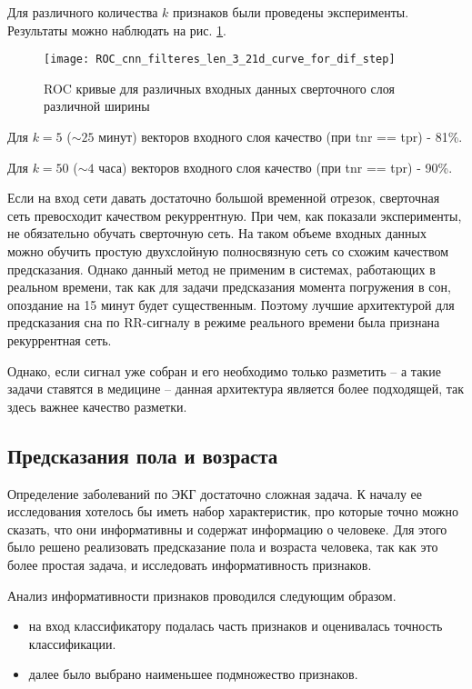 Для различного количества $k$ признаков были проведены эксперименты. Результаты можно наблюдать на рис. \ref{ris:roc_cnn}.

\begin{figure}[h!]
	\begin{center}
		\texttt{[image: ROC\_cnn\_filteres\_len\_3\_21d\_curve\_for\_dif\_step]}
		\caption{ROC кривые для различных входных данных сверточного слоя различной ширины}
		\label{ris:roc_cnn}
	\end{center}
\end{figure}

Для $k = 5 $  ($\sim 25$ минут) векторов входного слоя качество (при tnr == tpr) - 81\%.

Для $k = 50$ ($\sim 4$ часа) векторов входного слоя качество (при tnr == tpr) - 90\%.

Если на вход сети давать достаточно большой временной отрезок, сверточная сеть превосходит качеством рекуррентную. При чем, как показали эксперименты, не обязательно обучать сверточную сеть. На таком объеме входных данных можно обучить простую двухслойную полносвязную сеть со схожим качеством предсказания. Однако данный метод не применим в системах, работающих в реальном времени, так как для задачи предсказания момента погружения в сон, опоздание на 15 минут будет существенным. Поэтому лучшие архитектурой для предсказания сна по RR-сигналу в режиме реального времени была признана рекуррентная сеть.
 
Однако, если сигнал уже собран и его необходимо только разметить -- а такие задачи ставятся в медицине -- данная архитектура является более подходящей, так здесь важнее качество разметки.

\subsection{Предсказания пола и возраста}

Определение заболеваний по ЭКГ достаточно сложная задача. К началу ее исследования хотелось бы иметь набор характеристик, про которые точно можно сказать, что они информативны и содержат информацию о человеке.
Для этого было решено реализовать предсказание пола и возраста человека, так как это более простая задача, и исследовать информативность признаков.

Анализ информативности признаков проводился следующим образом.
\begin{itemize}
	\item на вход классификатору подалась часть признаков и оценивалась точность классификации.
	\item далее было выбрано наименьшее подмножество признаков.
\end{itemize}	

